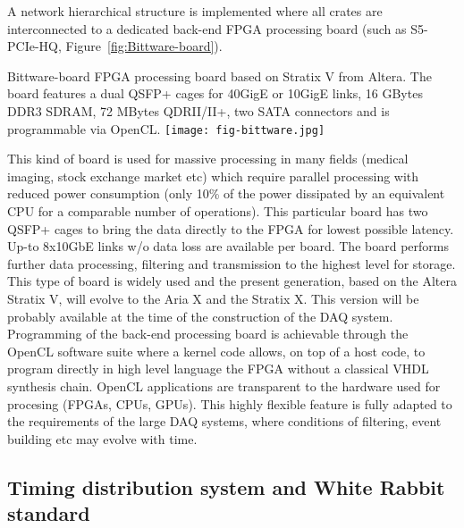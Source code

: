 A network hierarchical structure is implemented where all crates are
interconnected to a dedicated back-end FPGA processing board (such as
S5-PCIe-HQ, Figure~\ref{fig:Bittware-board}). 
\begin{cdrfigure}{Bittware-board}
{\small FPGA processing board based on Stratix V from Altera. The board 
features a dual QSFP+ cages for 40GigE or 10GigE links, 16 GBytes DDR3 SDRAM, 
72 MBytes QDRII/II+, two SATA connectors and is programmable via OpenCL.}
\texttt{[image: fig-bittware.jpg]}
\end{cdrfigure}
This kind of board is used for massive processing in many fields
(medical imaging, stock exchange market etc) which require parallel
processing with reduced power consumption (only 10\% of the power
dissipated by an equivalent CPU for a comparable number of
operations). This particular board has two QSFP+ cages to bring the
data directly to the FPGA for lowest possible latency. Up-to 8x10GbE
links w/o data loss are available per board.  The board performs
further data processing, filtering and transmission to the highest
level for storage. This type of board is widely used and the present
generation, based on the Altera Stratix V, will evolve to the Aria X
and the Stratix X. This version will be probably available at the time
of the construction of the DAQ system. Programming of the back-end
processing board is achievable through the OpenCL software suite where
a kernel code allows, on top of a host code, to program directly in
high level language the FPGA without a classical VHDL synthesis
chain. OpenCL applications are transparent to the hardware used for
procesing (FPGAs, CPUs, GPUs). This highly flexible feature is fully
adapted to the requirements of the large DAQ systems, where conditions
of filtering, event building etc may evolve with time.
 
\subsection{Timing distribution system and White Rabbit standard}

